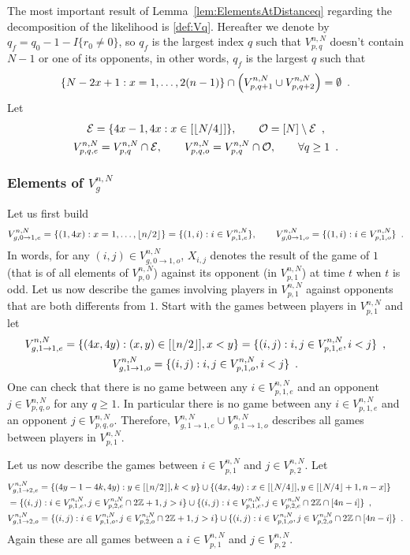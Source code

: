 The most important result of Lemma~\ref{lem:ElementsAtDistanceq} regarding the decomposition of the likelihood is \eqref{def:Vq}. Hereafter we denote by $q_f=q_0-1-I\{r_0\ne 0\}$, so $q_f$ is the largest index $q$ such that $V_{p,q}^{n,N}$ doesn't contain $N-1$ or one of its opponents, in other words, $q_f$ is the largest $q$ such that
\[
 \{N-2x+1 : x=1,\ldots, 2(n-1)\}\cap\left(V_{p,q+1}^{n,N}\cup V_{p,q+2}^{n,N}\right)=\emptyset\enspace.
 \] 
Let 
\begin{gather*}
\mathcal{E}=\{4x-1,4x : x\in[\left\lfloor N/4\right\rfloor]\},\qquad \mathcal{O}=[N]\setminus\mathcal{E}\enspace,\\
V_{p,q,e}^{n,N}= V_{p,q}^{n,N}\cap \mathcal{E},\qquad V_{p,q,o}^{n,N}= V_{p,q}^{n,N}\cap \mathcal{O},\qquad\forall q\ge 1\enspace. 
\end{gather*}

\subsubsection{Elements of $V_g^{n,N}$}

Let us first build 
\[
V_{g,0\to1,e}^{n,N}=\{(1,4x) : x=1,\ldots,\left\lfloor n/2\right\rfloor\}=\{(1,i) : i\in V_{p,1,e}^{n,N}\},\qquad V_{g,0\to1,o}^{n,N}=\{(1,i) : i\in V_{p,1,o}^{n,N}\}\enspace.
\]
In words, for any $(i,j)\in V_{g,0\to1,o}^{n,N}$, $X_{i,j}$ denotes the result of the game of $1$ (that is of all elements of $V_{p,0}^{n,N}$) against its opponent (in $V_{p,1}^{n,N}$) at time $t$ when $t$ is odd. Let us now describe the games involving players in $V_{p,1}^{n,N}$ against opponents that are both differents from $1$. Start with the games between players in $V_{p,1}^{n,N}$ and let 
\begin{gather*}
V_{g,1\to1,e}^{n,N}=\{(4x,4y) : (x,y)\in [\left\lfloor n/2\right\rfloor], x< y\}=\{(i,j) : i,j\in V_{p,1,e}^{n,N},i<j\}\enspace,\\
V_{g,1\to1,o}^{n,N}=\{(i,j) : i,j\in V_{p,1,o}^{n,N},i<j\}\enspace. 
\end{gather*}
One can check that there is no game between any $i\in V_{p,1,e}^{n,N}$ and an opponent $j\in V_{p,q,o}^{n,N}$ for any $q\ge 1$. 
In particular there is no game between any $i\in V_{p,1,e}^{n,N}$ and an opponent $j\in V_{p,q,o}^{n,N}$.  Therefore, $V_{g,1\to1,e}^{n,N}\cup V_{g,1\to1,o}^{n,N}$ describes all games between players in $V_{p,1}^{n,N}$. 

Let us now describe the games between $i\in V_{p,1}^{n,N}$ and $j\in V_{p,2}^{n,N}$. Let 
\begin{align*}
&V_{g,1\to2,e}^{n,N}=\{(4y-1-4k,4y) : y\in [\left\lfloor n/2\right\rfloor], k<y\}\cup\{(4x,4y) : x\in[\left\lfloor N/4\right\rfloor], y\in[\left\lfloor N/4\right\rfloor+1,n-x]\}\\
&=\{(i,j) : i\in V_{p,1,e}^{n,N},j\in V_{p,2,e}^{n,N}\cap 2\mathbb{Z}+1,j>i\}\cup\{(i,j) : i\in V_{p,1,e}^{n,N},j\in V_{p,2,e}^{n,N}\cap 2\mathbb{Z}\cap [4n-i]\}\enspace,\\
&V_{g,1\to2,o}^{n,N}=\{(i,j) : i\in V_{p,1,o}^{n,N},j\in V_{p,2,o}^{n,N}\cap 2\mathbb{Z}+1,j>i\}\cup\{(i,j) : i\in V_{p,1,o}^{n,N},j\in V_{p,2,o}^{n,N}\cap 2\mathbb{Z}\cap [4n-i]\}\enspace.
\end{align*}
Again these are all games between a $i\in V_{p,1}^{n,N}$ and $j\in V_{p,2}^{n,N}$.

